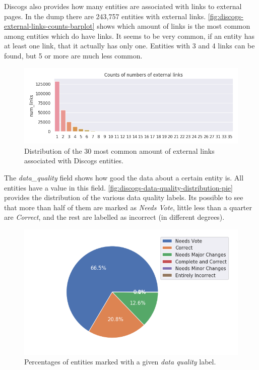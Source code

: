 \documentclass[epsfig,a4paper,11pt,titlepage,twoside,openany]{book}
\begin{document}
Discogs also provides how many entities are associated with links to external pages. In the dump there are 243,757 entities with external links. \autoref{fig:discogs-external-links-counts-barplot} shows which amount of links is the most common among entities which do have links. It seems to be very common, if an entity has at least one link, that it actually has only one. Entities with 3 and 4 links can be found, but 5 or more are much less common.

\begin{figure}[]
  \centering \includegraphics[width=\textwidth]{discogs_external_links_counts} 
  \caption{Distribution of the 30 most common amount of external links associated with Discogs entities.}
  \label{fig:discogs-external-links-counts-barplot}
\end{figure}

The \textit{data\_quality} field shows how good the data about a certain entity is. All entities have a value in this field. \autoref{fig:discogs-data-quality-distribution-pie} provides the distribution of the various data quality labels. Its possible to see that more than half of them are marked as \textit{Needs Vote}, little less than a quarter are \textit{Correct}, and the rest are labelled as incorrect (in different degrees).

\begin{figure}[]
  \centering \includegraphics[width=\textwidth]{discogs_data_quality_distribution} 
  \caption{Percentages of entities marked with a given \textit{data quality} label.}
  \label{fig:discogs-data-quality-distribution-pie}
\end{figure}
\end{document}
